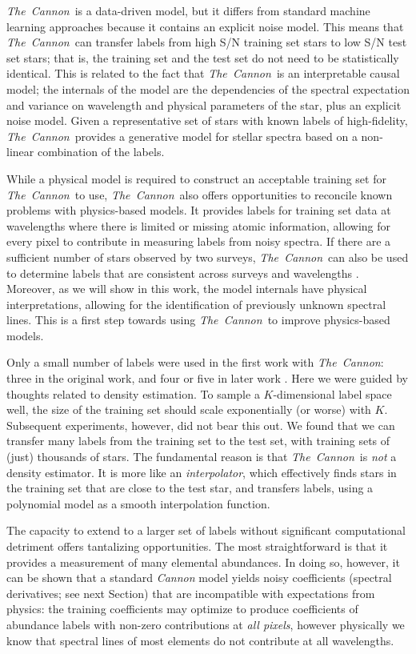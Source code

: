 \documentclass[12pt,preprint]{aastex}
\newcommand{\project}[1]{\textsl{#1}}
\newcommand{\TheCannon}{\project{The~Cannon}}
\begin{document}
  \TheCannon\ is a data-driven model, 
but it differs from standard machine learning approaches because it contains an 
explicit noise model.  This means that \TheCannon\ can transfer labels from high
S/N training set stars to low S/N test set stars; that is, the training set and
the test set do not need to be statistically identical.  This is related to the
fact that \TheCannon\ is an interpretable causal model; the internals of the model are 
the dependencies of the spectral expectation and variance on wavelength and 
physical parameters of the star, plus an explicit noise model.  Given a representative set of stars with known
labels of high-fidelity, \TheCannon\ provides a generative model for stellar 
spectra based on a non-linear combination of the labels.  



While a physical model is required to construct an acceptable training set for
\TheCannon\ to use, \TheCannon\ also offers opportunities to reconcile known problems with physics-based 
models.  It provides labels for training set data at wavelengths where there is
limited or missing atomic information, allowing for every pixel to contribute in 
measuring labels from noisy spectra.  If there are a sufficient
number of stars observed by two surveys, \TheCannon\ can also be used to determine labels that
are consistent across surveys and wavelengths \citep{Ho_2016}.  Moreover, as we
will show in this work, the model internals have physical interpretations, 
allowing for the identification of previously unknown spectral lines.  This is
a first step towards using \TheCannon\ to improve physics-based models.


Only a small number of labels were used in the first work with \TheCannon: 
three in the original work, and four or five in later work \citep{tc, age, Ho_2016}. 
Here we were guided by thoughts related to density estimation. To sample a 
$K$-dimensional label space well, the size of the training set should scale
exponentially (or worse) with $K$.  Subsequent experiments, however, did not 
bear this out.  We found that we can transfer many labels from the training set 
to the test set, with training sets of (just) thousands of stars.  The fundamental 
reason is that \TheCannon\ is \emph{not} a density estimator.  It is more like 
an \emph{interpolator}, which effectively finds stars in the training set that
are close to the test star, and transfers labels, using a polynomial 
model as a smooth interpolation function.


The capacity to extend to a larger set of labels without significant
computational detriment offers tantalizing opportunities.  The most 
straightforward is that it provides a measurement of many elemental abundances.
In doing so, however, it can be shown that a standard \emph{Cannon} model yields
noisy coefficients (spectral derivatives; see next Section) that are incompatible with 
expectations from physics: the training coefficients may optimize to produce 
coefficients of abundance labels with non-zero 
contributions at \emph{all pixels}, however physically we know that spectral lines of most
elements do not contribute at all wavelengths. 
\end{document}
